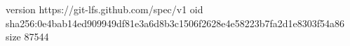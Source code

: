 version https://git-lfs.github.com/spec/v1
oid sha256:0e4bab14ed909949df81e3a6d8b3c1506f2628e4e58223b7fa2d1e8303f54a86
size 87544
